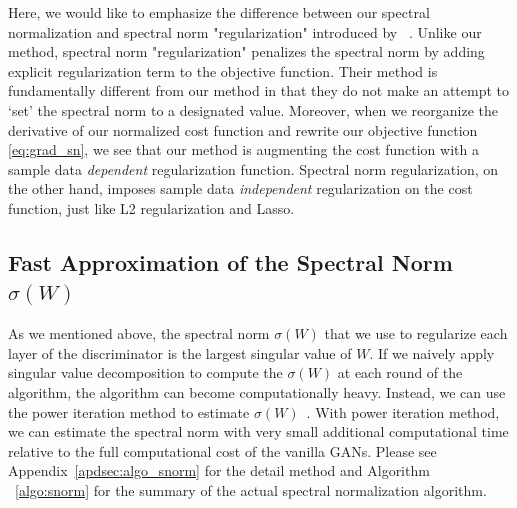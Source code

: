 \documentclass{article}
\begin{document}
Here, we would like to emphasize the difference between our spectral normalization and spectral norm "regularization" introduced by ~\cite{yoshida2017spectral}.
Unlike our method, spectral norm "regularization" penalizes the spectral norm by adding explicit regularization term to the objective function. Their method is fundamentally different from our method in that they do not make an attempt to `set' the spectral norm to a designated value. Moreover, when we reorganize the derivative of our normalized cost function and rewrite our objective function \eqref{eq:grad_sn}, we see that our method is augmenting the cost function with a sample data \textit{dependent} regularization function. 
Spectral norm regularization, on the other hand, imposes sample data \textit{independent} regularization on the cost function,  just like L2 regularization and Lasso. 

\subsection{Fast Approximation of the Spectral Norm $\sigma(W)$}
As we mentioned above, the spectral norm $\sigma(W)$ that we use to regularize each layer of the discriminator is the largest singular value of $W$.
If we naively apply singular value decomposition to compute the $\sigma(W)$ at each round of the algorithm, the algorithm can become computationally heavy. Instead, we can use the power iteration method to estimate $\sigma(W)$~\cite[]{golub2000eigenvalue, yoshida2017spectral}.
With power iteration method, we can estimate the spectral norm with very small additional computational time relative to the full computational cost of the vanilla GANs.
Please see Appendix~\ref{apdsec:algo_snorm} for the detail method and Algorithm ~\ref{algo:snorm} for the summary of the actual spectral normalization algorithm.
\end{document}
